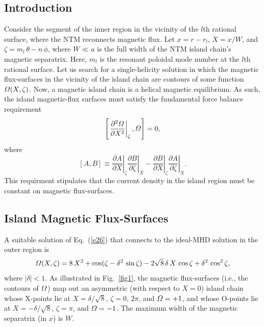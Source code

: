 \documentclass[12pt,prb,aps]{revtex4-1}
\begin{document}
\subsection{Introduction}
Consider the segment of the inner region in the vicinity of the $l$th rational surface, where the NTM reconnects magnetic flux. 
Let $x=r-r_{l}$, $X=x/W$, and $\zeta=m_{l}\,\theta-n\,\phi$, where $W\ll a$ is the full width  of the NTM island chain's magnetic separatrix. 
Here, $m_l$ is the resonant poloidal mode number at the $l$th rational surface. 
Let us search for a single-helicity solution in which the magnetic flux-surfaces in the vicinity of the island chain are contours of some function ${\mit\Omega}(X,\zeta)$.
Now, a magnetic island chain is a helical magnetic equilibrium.\cite{ntm1} As such, the island magnetic-flux surfaces must satisfy the fundamental
force balance requirement\,\cite{island}
\begin{equation}\label{e26}
\left[\left.\frac{\partial^2{\mit\Omega}}{\partial X^2}\right|_\zeta,{\mit\Omega}\right]=0,
\end{equation}
where
\begin{equation}\label{poisson}
[A,B] \equiv \left.\frac{\partial A}{\partial X}\right|_\zeta \left.\frac{\partial B}{\partial\zeta}\right|_X- \left.\frac{\partial B}{\partial X}\right|_\zeta \left.\frac{\partial A}{\partial\zeta}\right|_X.
\end{equation}
This requirment stipulates that the current density in the island region must be constant on magnetic flux-surfaces. 

\subsection{Island Magnetic Flux-Surfaces}
A suitable solution of Eq.~(\ref{e26}) that connects to the ideal-MHD solution in the outer region is\,\cite{island}
\begin{equation}\label{e45}
{\mit\Omega}(X,\zeta) = 8\,X^2 + \cos(\zeta-\delta^2\,\sin\zeta) - 2\sqrt{8}\,\delta\,X\,\cos\zeta+\delta^2\,\cos^2\zeta,
\end{equation}
where $|\delta|<1$.  As illustrated in Fig.~\ref{fig1}, the magnetic flux-surfaces  (i.e., the contours of ${\mit\Omega}$) map out an
asymmetric (with respect to $X=0$) island chain whose 
X-points lie at $X=\delta/\sqrt{8}$, $\zeta = 0$, $2\pi$, and ${\mit\Omega}=+1$,  and whose  O-points lie at
$X=-\delta/\sqrt{8}$,  $\zeta=\pi$, and ${\mit\Omega}=-1$. The maximum width of the magnetic separatrix (in $x$) is $W$. 
\end{document}
